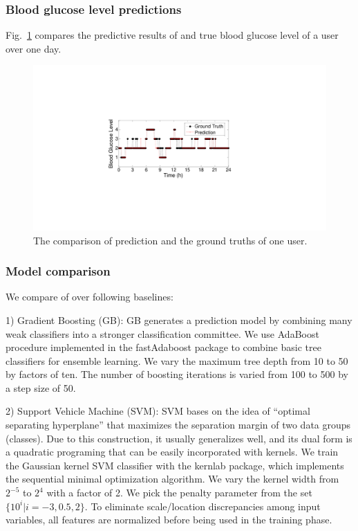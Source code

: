\subsubsection{Blood glucose level predictions}

Fig.~\ref{fig:pre_gt} compares the predictive results of \sysname and true blood glucose level of a user over one day.






\begin{figure}[!t]
\centering
\includegraphics[width=0.5\columnwidth]{./img/pred_vs_gt.pdf}
\caption{The comparison of prediction and the ground truths of one user.}
\label{fig:pre_gt}
\end{figure}


\subsubsection{Model comparison}

We compare \modelname of \sysname over following baselines:

1) Gradient Boosting (GB): GB generates a prediction model by combining many weak classifiers into a stronger classification committee. We use AdaBoost procedure implemented in the fastAdaboost package to combine basic tree classifiers for ensemble learning. We vary the maximum tree depth from 10 to 50 by factors of ten. The number of boosting iterations is varied from 100 to 500 by a step size of 50.

2) Support Vehicle Machine (SVM): SVM bases on the idea of “optimal separating hyperplane” that maximizes the separation margin of two data groups (classes). Due to this construction, it usually generalizes well, and its dual form is a quadratic programing that can be easily incorporated with kernels. We train the Gaussian kernel SVM classifier with the kernlab package, which implements the sequential minimal optimization algorithm. We vary the kernel width from $2^{-5}$ to $2^4$ with a factor of 2. We pick the penalty parameter from the set $\{10^i | i = -3, 0.5, 2\}$. To eliminate scale/location discrepancies among input variables, all features are normalized before being used in the training phase.

